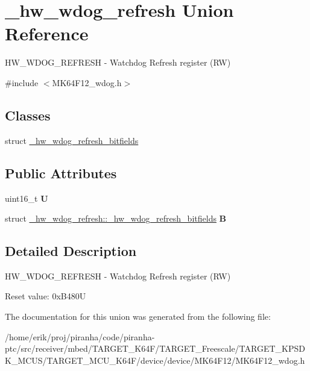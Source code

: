 \hypertarget{union__hw__wdog__refresh}{}\section{\+\_\+hw\+\_\+wdog\+\_\+refresh Union Reference}
\label{union__hw__wdog__refresh}


H\+W\+\_\+\+W\+D\+O\+G\+\_\+\+R\+E\+F\+R\+E\+SH -\/ Watchdog Refresh register (RW)  




{\ttfamily \#include $<$M\+K64\+F12\+\_\+wdog.\+h$>$}

\subsection*{Classes}
\begin{DoxyCompactItemize}
\item 
struct \hyperlink{struct__hw__wdog__refresh_1_1__hw__wdog__refresh__bitfields}{\+\_\+hw\+\_\+wdog\+\_\+refresh\+\_\+bitfields}
\end{DoxyCompactItemize}
\subsection*{Public Attributes}
\begin{DoxyCompactItemize}
\item 
uint16\+\_\+t {\bfseries U}\hypertarget{union__hw__wdog__refresh_a256bb65603fe88ab0aa7aea2940e00df}{}\label{union__hw__wdog__refresh_a256bb65603fe88ab0aa7aea2940e00df}

\item 
struct \hyperlink{struct__hw__wdog__refresh_1_1__hw__wdog__refresh__bitfields}{\+\_\+hw\+\_\+wdog\+\_\+refresh\+::\+\_\+hw\+\_\+wdog\+\_\+refresh\+\_\+bitfields} {\bfseries B}\hypertarget{union__hw__wdog__refresh_a7d200b34a701f6f9c47820fab9d5da03}{}\label{union__hw__wdog__refresh_a7d200b34a701f6f9c47820fab9d5da03}

\end{DoxyCompactItemize}


\subsection{Detailed Description}
H\+W\+\_\+\+W\+D\+O\+G\+\_\+\+R\+E\+F\+R\+E\+SH -\/ Watchdog Refresh register (RW) 

Reset value\+: 0x\+B480U 

The documentation for this union was generated from the following file\+:\begin{DoxyCompactItemize}
\item 
/home/erik/proj/piranha/code/piranha-\/ptc/src/receiver/mbed/\+T\+A\+R\+G\+E\+T\+\_\+\+K64\+F/\+T\+A\+R\+G\+E\+T\+\_\+\+Freescale/\+T\+A\+R\+G\+E\+T\+\_\+\+K\+P\+S\+D\+K\+\_\+\+M\+C\+U\+S/\+T\+A\+R\+G\+E\+T\+\_\+\+M\+C\+U\+\_\+\+K64\+F/device/device/\+M\+K64\+F12/M\+K64\+F12\+\_\+wdog.\+h\end{DoxyCompactItemize}
